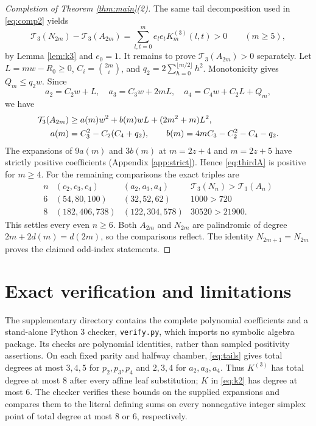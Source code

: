 \documentclass[11pt]{article}
\newcommand{\T}{\mathcal T}
\begin{document}
\begin{proof}[Completion of Theorem \ref{thm:main}(2)]
The same tail decomposition used in \eqref{eq:comp2} yields
\[
 \T_3(N_{2m})-\T_3(A_{2m})
 =\sum_{l,t=0}^m e_le_tK^{(3)}_m(l,t)>0\qquad(m\ge5),
\]
by Lemma \ref{lem:k3} and $e_0=1$.
It remains to prove $\T_3(A_{2m})>0$ separately. Let
$L=mw-R_0\ge0$, $C_i=\binom{2m}{i}$, and
$q_2=2\sum_{h=0}^{\lfloor m/2\rfloor}h^2$.
Monotonicity gives $Q_m\le q_2w$. Since
\[
 a_2=C_2w+L,\quad a_3=C_3w+2mL,\quad
 a_4=C_4w+C_2L+Q_m,
\]
we have
\begin{align}\label{eq:thirdA}
 \T_3(A_{2m})&\ge a(m)w^2+b(m)wL+(2m^2+m)L^2,\\
 a(m)&=C_3^2-C_2(C_4+q_2),\qquad
 b(m)=4mC_3-C_2^2-C_4-q_2.\notag
\end{align}
The expansions of $9a(m)$ and $3b(m)$ at $m=2z+4$ and $m=2z+5$
have strictly positive coefficients (Appendix \ref{app:strict}).
Hence \eqref{eq:thirdA} is positive for $m\ge4$.
For the remaining comparisons the exact triples are
\[
\begin{array}{c|c|c|c}
 n&(c_2,c_3,c_4)&(a_2,a_3,a_4)&\T_3(N_n)>\T_3(A_n)\\\hline
 6&(54,80,100)&(32,52,62)&1000>720\\
 8&(182,406,738)&(122,304,578)&30520>21900.
\end{array}
\]
This settles every even $n\ge6$. Both $A_{2m}$ and $N_{2m}$ are
palindromic of degree $2m+2d(m)=d(2m)$, so the comparisons reflect.
The identity $N_{2m+1}=N_{2m}$ proves the claimed odd-index statements.
\end{proof}

\section{Exact verification and limitations}\label{sec:verify}
The supplementary directory contains the complete polynomial coefficients
and a stand-alone Python 3 checker, \texttt{verify.py}, which imports no
symbolic algebra package. Its checks are polynomial identities, rather
than sampled positivity assertions. On each fixed parity and halfway chamber,
\eqref{eq:tails} gives total degrees at most $3,4,5$ for $p_2,p_3,p_4$
and $2,3,4$ for $a_2,a_3,a_4$. Thus $K^{(3)}$ has total degree at most $8$
after every affine leaf substitution; $K$ in \eqref{eq:k2} has degree at most
$6$. The checker verifies these bounds on the supplied expansions and
compares them to the literal defining sums on every nonnegative integer
simplex point of total degree at most $8$ or $6$, respectively.
\end{document}
